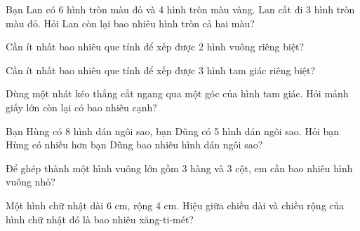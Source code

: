 \begin{ex}
Bạn Lan có 6 hình tròn màu đỏ và 4 hình tròn màu vàng. Lan cất đi 3 hình tròn màu đỏ. Hỏi Lan còn lại bao nhiêu hình tròn cả hai màu?
\end{ex}

\begin{ex}
Cần ít nhất bao nhiêu que tính để xếp được 2 hình vuông riêng biệt?
\end{ex}

\begin{ex}
Cần ít nhất bao nhiêu que tính để xếp được 3 hình tam giác riêng biệt?
\end{ex}

\begin{ex}
Dùng một nhát kéo thẳng cắt ngang qua một góc của hình tam giác. Hỏi mảnh giấy lớn còn lại có bao nhiêu cạnh?
\end{ex}

\begin{ex}
Bạn Hùng có 8 hình dán ngôi sao, bạn Dũng có 5 hình dán ngôi sao. Hỏi bạn Hùng có nhiều hơn bạn Dũng bao nhiêu hình dán ngôi sao?
\end{ex}

\begin{ex}
Để ghép thành một hình vuông lớn gồm 3 hàng và 3 cột, em cần bao nhiêu hình vuông nhỏ?
\end{ex}

\begin{ex}
Một hình chữ nhật dài 6 cm, rộng 4 cm. Hiệu giữa chiều dài và chiều rộng của hình chữ nhật đó là bao nhiêu xăng-ti-mét?
\end{ex}

